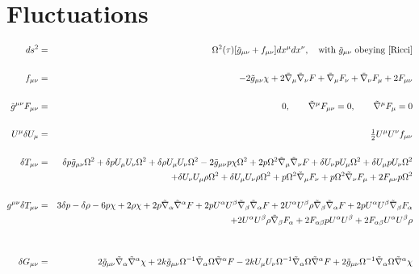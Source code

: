 \documentclass[10pt,letterpaper]{article}
\numberwithin{equation}{section}
\begin{document}
\section{Fluctuations}
\begin{eqnarray}
ds^2 &=& \Omega^2(\tau)[\tilde g_{\mu\nu}+ f_{\mu\nu}] dx^\mu dx^\nu,\quad \text{with $\tilde g_{\mu\nu}$ obeying \eqref{Ricci}}
\\ \nonumber\\
f_{\mu\nu} &=& -2\tilde g_{\mu\nu}\chi + 2\tilde\nabla_\mu \tilde\nabla_\nu F + \tilde\nabla_\mu F_\nu +\tilde\nabla_\nu F_\mu+ 2F_{\mu\nu}
\label{svt}
\\ \nonumber\\
\tilde g^{\mu\nu} F_{\mu\nu} &=&0,\qquad \tilde\nabla^\mu F_{\mu\nu} = 0,\qquad \tilde\nabla^\mu F_\mu = 0
\\ \nonumber\\
U^\mu \delta U_\mu &=& \tfrac12 U^\mu U^\nu f_{\mu\nu}
\\ \nonumber\\
\delta T_{\mu\nu}&=& \delta p \tilde{g}_{\mu \nu } \Omega^2 + \delta p U_{\mu } U_{\nu } \Omega^2 + \delta \rho U_{\mu } U_{\nu } \Omega^2 - 2 \tilde{g}_{\mu \nu } p \chi \Omega^2 + 2 p \Omega^2 \tilde{\nabla}_{\mu }\tilde{\nabla}_{\nu }F+\delta U_{\nu } p U_{\mu } \Omega^2 + \delta U_{\mu } p U_{\nu } \Omega^2 \nonumber \\ 
&& + \delta U_{\nu } U_{\mu } \rho \Omega^2 + \delta U_{\mu } U_{\nu } \rho \Omega^2 + p \Omega^2 \tilde{\nabla}_{\mu }F_{\nu } + p \Omega^2 \tilde{\nabla}_{\nu }F_{\mu }+2 F_{\mu \nu } p \Omega^2
\\  \nonumber\\ 
g^{\mu\nu}\delta T_{\mu\nu}&=& 3 \delta p -  \delta \rho - 6 p \chi + 2 \rho \chi + 2 p \tilde{\nabla}_{\alpha }\tilde{\nabla}^{\alpha }F + 2 p U^{\alpha } U^{\beta } \tilde{\nabla}_{\beta }\tilde{\nabla}_{\alpha }F + 2 U^{\alpha } U^{\beta } \rho \tilde{\nabla}_{\beta }\tilde{\nabla}_{\alpha }F+2 p U^{\alpha } U^{\beta } \tilde{\nabla}_{\beta }F_{\alpha } \nonumber \\ 
&& + 2 U^{\alpha } U^{\beta } \rho \tilde{\nabla}_{\beta }F_{\alpha }+2 F_{\alpha \beta } p U^{\alpha } U^{\beta } + 2 F_{\alpha \beta } U^{\alpha } U^{\beta } \rho 
\nonumber\\  \\ \nonumber\\
\delta G_{\mu\nu}&=& 2 \tilde{g}_{\mu \nu } \tilde{\nabla}_{\alpha }\tilde{\nabla}^{\alpha }\chi + 2 k \tilde{g}_{\mu \nu } \Omega^{-1} \tilde{\nabla}_{\alpha }\Omega \tilde{\nabla}^{\alpha }F - 2 k U_{\mu } U_{\nu } \Omega^{-1} \tilde{\nabla}_{\alpha }\Omega \tilde{\nabla}^{\alpha }F + 2 \tilde{g}_{\mu \nu } \Omega^{-1} \tilde{\nabla}_{\alpha }\Omega \tilde{\nabla}^{\alpha }\chi \nonumber \\ 

\end{eqnarray}
\end{document}
